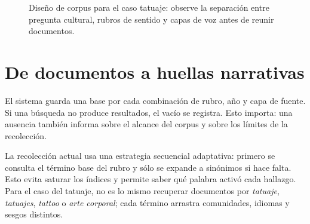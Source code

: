 \documentclass[11pt]{article}
\begin{document}
\begin{figure}[H]
\centering
{}
\caption{Diseño de corpus para el caso tatuaje: observe la separación entre pregunta cultural, rubros de sentido y capas de voz antes de reunir documentos.}
\label{fig:corpus-tatuaje-es}
\end{figure}

\section{De documentos a huellas narrativas}

El sistema guarda una base por cada combinación de rubro, año y capa de fuente.
Si una búsqueda no produce resultados, el vacío se registra. Esto importa: una
ausencia también informa sobre el alcance del corpus y sobre los límites de la
recolección.

La recolección actual usa una estrategia secuencial adaptativa: primero se
consulta el término base del rubro y sólo se expande a sinónimos si hace falta.
Esto evita saturar los índices y permite saber qué palabra activó cada hallazgo.
Para el caso del tatuaje, no es lo mismo recuperar documentos por
\textit{tatuaje}, \textit{tatuajes}, \textit{tattoo} o \textit{arte corporal};
cada término arrastra comunidades, idiomas y sesgos distintos.
\end{document}
